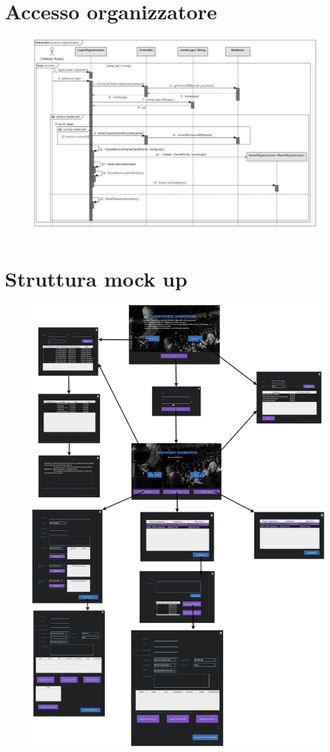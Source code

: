\documentclass[a4paper,italian,10pt,openany]{book}
\begin{document}
\section{Accesso organizzatore}
\vspace{4cm}
\begin{figure}[h!]
\centering
\includegraphics[width=18cm]{SD2}
\end{figure}
\newpage
\section{Struttura mock up}
\vspace{.5cm}
\begin{figure}[h!]
\centering
\includegraphics[width=14.5cm]{mockup}
\end{figure}
\end{document}
